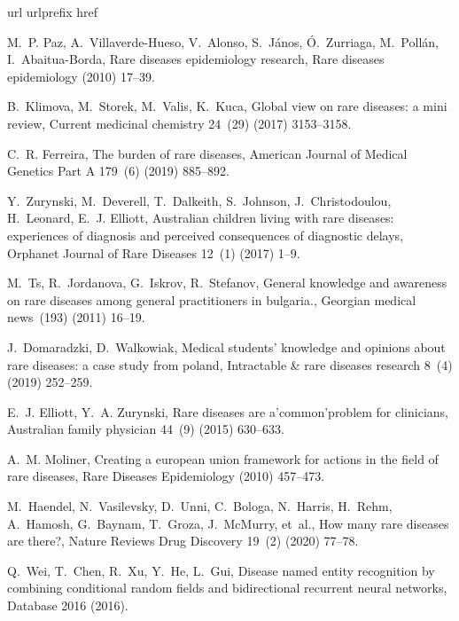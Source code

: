 \documentclass[preprint,12pt]{elsarticle}
\begin{document}
\begin{thebibliography}{10}
\expandafter\ifx\csname url\endcsname\relax
  \def\url#1{\texttt{#1}}\fi
\expandafter\ifx\csname urlprefix\endcsname\relax\def\urlprefix{URL }\fi
\expandafter\ifx\csname href\endcsname\relax
  \def\href#1#2{#2} \def\path#1{#1}\fi

M.~P. Paz, A.~Villaverde-Hueso, V.~Alonso, S.~J{\'a}nos, {\'O}.~Zurriaga,
  M.~Poll{\'a}n, I.~Abaitua-Borda, Rare diseases epidemiology research, Rare
  diseases epidemiology (2010) 17--39.

B.~Klimova, M.~Storek, M.~Valis, K.~Kuca, Global view on rare diseases: a mini
  review, Current medicinal chemistry 24~(29) (2017) 3153--3158.

C.~R. Ferreira, The burden of rare diseases, American Journal of Medical
  Genetics Part A 179~(6) (2019) 885--892.

Y.~Zurynski, M.~Deverell, T.~Dalkeith, S.~Johnson, J.~Christodoulou,
  H.~Leonard, E.~J. Elliott, Australian children living with rare diseases:
  experiences of diagnosis and perceived consequences of diagnostic delays,
  Orphanet Journal of Rare Diseases 12~(1) (2017) 1--9.

M.~Ts, R.~Jordanova, G.~Iskrov, R.~Stefanov, General knowledge and awareness on
  rare diseases among general practitioners in bulgaria., Georgian medical
  news~(193) (2011) 16--19.

J.~Domaradzki, D.~Walkowiak, Medical students' knowledge and opinions about
  rare diseases: a case study from poland, Intractable \& rare diseases
  research 8~(4) (2019) 252--259.

E.~J. Elliott, Y.~A. Zurynski, Rare diseases are a'common'problem for
  clinicians, Australian family physician 44~(9) (2015) 630--633.

A.~M. Moliner, Creating a european union framework for actions in the field of
  rare diseases, Rare Diseases Epidemiology (2010) 457--473.

M.~Haendel, N.~Vasilevsky, D.~Unni, C.~Bologa, N.~Harris, H.~Rehm, A.~Hamosh,
  G.~Baynam, T.~Groza, J.~McMurry, et~al., How many rare diseases are there?,
  Nature Reviews Drug Discovery 19~(2) (2020) 77--78.

Q.~Wei, T.~Chen, R.~Xu, Y.~He, L.~Gui, Disease named entity recognition by
  combining conditional random fields and bidirectional recurrent neural
  networks, Database 2016 (2016).


\end{thebibliography}
\end{document}
